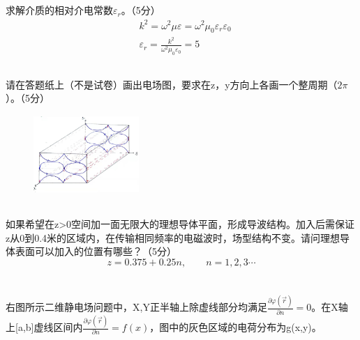\documentclass[UTF8]{ctexart}
\begin{document}
\subsection{}
\paragraph{}
求解介质的相对介电常数$\varepsilon_r$。（5分）
\begin{equation*}
\begin{aligned}
&k^2=\omega^2\mu \varepsilon=\omega^2\mu_0\varepsilon_r\varepsilon_0\\
&\varepsilon_r=\frac{k^2}{\omega^2\mu_0\varepsilon_0}=5
\end{aligned}
\end{equation*}
\subsection{}
\paragraph{}
请在答题纸上（不是试卷）画出电场图，要求在z，y方向上各画一个整周期（$2\pi$）。（5分）
\begin{figure}[htbp]
\centering
\includegraphics[width=4cm,height=3cm]{2015-4.jpg}
\end{figure}
\subsection{}
\paragraph{}
如果希望在z>0空间加一面无限大的理想导体平面，形成导波结构。加入后需保证z从0到0.4米的区域内，在传输相同频率的电磁波时，场型结构不变。请问理想导体表面可以加入的位置有哪些？（5分）\\
\[z=0.375+0.25n,\quad\quad n=1,2,3\cdots\]
\section{}
\paragraph{}
右图所示二维静电场问题中，X,Y正半轴上除虚线部分均满足$\frac{\partial\varphi(\vec r)}{\partial n}=0$。在X轴上[a,b]虚线区间内$\frac{\partial\varphi(\vec r)}{\partial n}=f(x)$，图中的灰色区域的电荷分布为g(x,y)。
\end{document}
